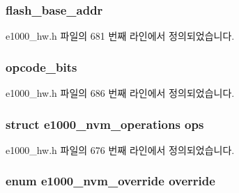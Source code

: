 \subsubsection[{\texorpdfstring{flash\+\_\+base\+\_\+addr}{flash_base_addr}}]{ flash\+\_\+base\+\_\+addr}\hypertarget{structe1000__nvm__info_ae94ac7d19708a37fb8dbd72466cd6001}{}\label{structe1000__nvm__info_ae94ac7d19708a37fb8dbd72466cd6001}


e1000\+\_\+hw.\+h 파일의 681 번째 라인에서 정의되었습니다.

\subsubsection[{\texorpdfstring{opcode\+\_\+bits}{opcode_bits}}]{ opcode\+\_\+bits}\hypertarget{structe1000__nvm__info_a2a55e8d34044fa25950d407750b10128}{}\label{structe1000__nvm__info_a2a55e8d34044fa25950d407750b10128}


e1000\+\_\+hw.\+h 파일의 686 번째 라인에서 정의되었습니다.

\subsubsection[{\texorpdfstring{ops}{ops}}]{\setlength{\rightskip}{0pt plus 5cm}struct {\bf e1000\+\_\+nvm\+\_\+operations} ops}\hypertarget{structe1000__nvm__info_a12baf99f899cbc083e85c8d1331a7773}{}\label{structe1000__nvm__info_a12baf99f899cbc083e85c8d1331a7773}


e1000\+\_\+hw.\+h 파일의 676 번째 라인에서 정의되었습니다.

\subsubsection[{\texorpdfstring{override}{override}}]{\setlength{\rightskip}{0pt plus 5cm}enum {\bf e1000\+\_\+nvm\+\_\+override} override}\hypertarget{structe1000__nvm__info_a998854fce83900d8ef69aec311b464e7}{}\label{structe1000__nvm__info_a998854fce83900d8ef69aec311b464e7}



